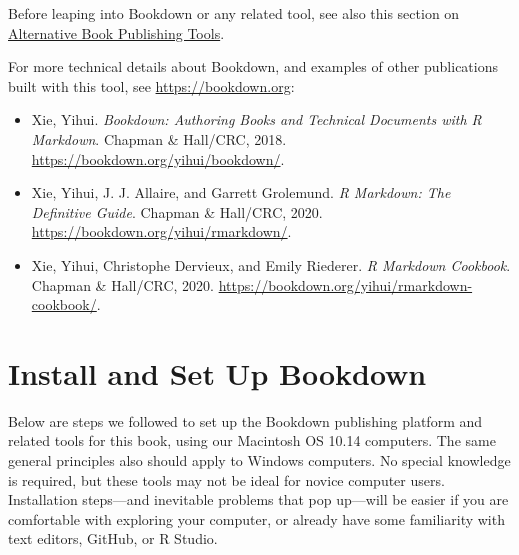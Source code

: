 \documentclass[
  english,
]{book}
\providecommand{\tightlist}{%
  \setlength{\itemsep}{0pt}\setlength{\parskip}{0pt}}
\begin{document}
Before leaping into Bookdown or any related tool, see also this section on \href{alternative.html}{Alternative Book Publishing Tools}.

For more technical details about Bookdown, and examples of other publications built with this tool, see \url{https://bookdown.org}:

\begin{itemize}
\tightlist
\item
  Xie, Yihui. \emph{Bookdown: Authoring Books and Technical Documents with R Markdown}. Chapman \& Hall/CRC, 2018. \url{https://bookdown.org/yihui/bookdown/}.
\item
  Xie, Yihui, J. J. Allaire, and Garrett Grolemund. \emph{R Markdown: The Definitive Guide}. Chapman \& Hall/CRC, 2020. \url{https://bookdown.org/yihui/rmarkdown/}.
\item
  Xie, Yihui, Christophe Dervieux, and Emily Riederer. \emph{R Markdown Cookbook}. Chapman \& Hall/CRC, 2020. \url{https://bookdown.org/yihui/rmarkdown-cookbook/}.
\end{itemize}

\hypertarget{install}{%
\section*{Install and Set Up Bookdown}\label{install}}

Below are steps we followed to set up the Bookdown publishing platform and related tools for this book, using our Macintosh OS 10.14 computers. The same general principles also should apply to Windows computers. No special knowledge is required, but these tools may not be ideal for novice computer users. Installation steps---and inevitable problems that pop up---will be easier if you are comfortable with exploring your computer, or already have some familiarity with text editors, GitHub, or R Studio.
\end{document}
